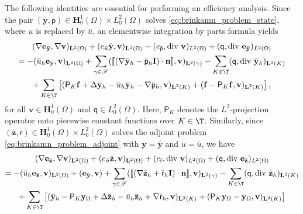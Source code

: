 \documentclass[final]{siamart0216}
\begin{document}
The following identities are essential for performing an efficiency analysis. Since the pair $(\bar{\mathbf{y}},\bar{\mathsf{\mathsf{p}}})\in\mathbf{H}_0^1(\Omega)\times L_0^2(\Omega)$ solves \eqref{eq:brinkamn_problem_state}, where $u$ is replaced by $\bar{u}$, an elementwise integration by parts formula yields
\begin{multline}\label{eq:brinkamn_problem01_aux_error}
(\nabla \mathbf{e}_{\bar{\mathbf{y}}},\nabla \mathbf{v})_{\mathbf{L}^2(\Omega)}+( e_{\bar{u}}\bar{\mathbf{y}}, \mathbf{v})_{\mathbf{L}^2(\Omega)}-(e_{\bar{\mathsf{p}}},\text{div }\mathbf{v})_{L^2(\Omega)} + (\mathsf{q},\text{div }\mathbf{e}_{\bar{\mathbf{y}}})_{L^2(\Omega)}\\= -(\bar{u}_{h}\mathbf{e}_{\bar{\mathbf{y}}},\mathbf{v})_{\mathbf{L}^2(\Omega)}+ \sum_{\gamma\in \mathscr{S}} (\llbracket(\nabla \bar{\mathbf{y}}_{h}-\bar{\mathsf{p}}_{h}\mathbf{I})\cdot \mathbf{n}\rrbracket,\mathbf{v})_{\mathbf{L}^2(\gamma)}-\sum_{K\in\T}(\mathsf{q},\text{div }\bar{\mathbf{y}}_{h})_{\mathbf{L}^2(K)}\\
+
\sum_{K\in\T}
\left[(\mathsf{P}_{K}\mathbf{f}+\Delta \bar{\mathbf{y}}_{h}-\bar{u}_{h}\bar{\mathbf{y}}_{h}-\nabla\bar{\mathsf{p}}_{h},\mathbf{v})_{\mathbf{L}^2(K)}+(\mathbf{f}-\mathsf{P}_{K}\mathbf{f},\mathbf{v})_{\mathbf{L}^2(K)}\right],
\end{multline}
for all $\mathbf{v}\in \mathbf{H}_0^1(\Omega)$ and $\mathsf{q}\in L_0^2(\Omega)$. Here, $\mathsf{P}_K$ denotes the $L^2$-projection operator onto piecewise constant functions over $K\in\T$. Similarly, since $(\bar{\mathbf{z}},\bar{\mathsf{\mathsf{r}}})\in\mathbf{H}_0^1(\Omega)\times L_0^2(\Omega)$ solves the adjoint problem \eqref{eq:brinkamn_problem_adjoint} with $\mathbf{y}=\bar{\mathbf{y}}$ and $u=\bar{u}$, we have
\begin{multline}\label{eq:brinkamn_problem02_aux_error}
(\nabla \mathbf{e}_{\bar{\mathbf{z}}},\nabla \mathbf{v})_{\mathbf{L}^2(\Omega)}+( e_{\bar{u}}\bar{\mathbf{z}}, \mathbf{v})_{\mathbf{L}^2(\Omega)}+(e_{\bar{\mathsf{r}}},\text{div }\mathbf{v})_{L^2(\Omega)} + (\mathsf{q},\text{div }\mathbf{e}_{\bar{\mathbf{z}}})_{L^2(\Omega)}\\= -(\bar{u}_{h}\mathbf{e}_{\bar{\mathbf{z}}},\mathbf{v})_{\mathbf{L}^2(\Omega)}+ (\mathbf{e}_{\bar{\mathbf{y}}},\mathbf{v})+ \sum_{\gamma\in \mathscr{S}} (\llbracket(\nabla \bar{\mathbf{z}}_{h}+\bar{\mathsf{r}}_{h}\mathbf{I})\cdot \mathbf{n}\rrbracket,\mathbf{v})_{\mathbf{L}^2(\gamma)}-\sum_{K\in\T}(\mathsf{q},\text{div }\bar{\mathbf{z}}_{h})_{\mathbf{L}^2(K)}
\\
+
\sum_{K\in\T}
\left[
(\bar{\mathbf{y}}_{h}-\mathsf{P}_{K}\mathbf{y}_{\Omega}+\Delta \bar{\mathbf{z}}_{h}-\bar{u}_{h}\bar{\mathbf{z}}_{h}+\nabla\bar{\mathsf{r}}_{h},\mathbf{v})_{\mathbf{L}^2(K)}+(\mathsf{P}_{K}\mathbf{y}_{\Omega}-\mathbf{y}_{\Omega},\mathbf{v})_{\mathbf{L}^2(K)}
\right]
\end{multline}
\end{document}
